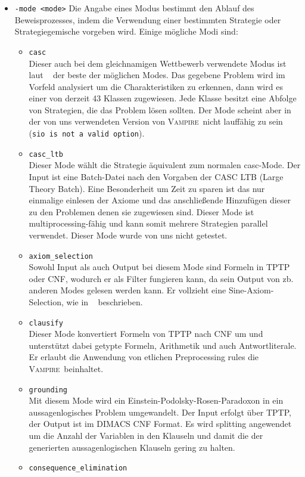 \documentclass{article}
\newcommand{\vampire}{\textsc{Vampire}~}
\begin{document}
\begin{itemize}
\item \verb|-mode <mode>| \label{arg:modes}
Die Angabe eines Modus bestimmt den Ablauf des Beweisprozesses, 
indem die Verwendung einer bestimmten Strategie oder Strategiegemische vorgeben wird.
Einige mögliche Modi sind:
\begin{itemize}
	\item \verb|casc| \\
	Dieser auch bei dem gleichnamigen Wettbewerb verwendete Modus ist laut ~\cite{hoder2011slides} der beste der möglichen Modes.
	Das gegebene Problem wird im Vorfeld analysiert um die Charakteristiken zu erkennen, dann wird es einer von derzeit 43 Klassen zugewiesen. Jede Klasse besitzt eine Abfolge von Strategien, die das Problem lösen sollten.
	Der Mode scheint aber in der von uns verwendeten Version von \vampire nicht lauffähig zu sein (\texttt{sio is not a valid option}).
	\item \verb|casc_ltb| \\
	Dieser Mode wählt die Strategie äquivalent zum normalen casc-Mode. Der Input ist eine Batch-Datei nach den Vorgaben der CASC LTB (Large Theory Batch). Eine Besonderheit um Zeit zu sparen ist das nur einmalige einlesen der Axiome und das anschließende Hinzufügen dieser zu den Problemen denen sie zugewiesen sind. Dieser Mode ist multiprocessing-fähig und kann somit mehrere Strategien parallel verwendet. Dieser Mode wurde von uns nicht getestet.
	\item \verb|axiom_selection| \\
	Sowohl Input als auch Output bei diesem Mode sind Formeln in TPTP oder CNF, wodurch er als Filter fungieren kann, da sein Output von zb. anderen Modes gelesen werden kann.
	Er vollzieht eine Sine-Axiom-Selection, wie in ~\cite{sinquanon} beschrieben.
	\item \verb|clausify| \\
	Dieser Mode konvertiert Formeln von TPTP nach CNF um und unterstützt dabei getypte Formeln, Arithmetik und auch Antwortliterale. Er erlaubt die Anwendung von etlichen Preprocessing rules die \vampire beinhaltet.
	\item \verb|grounding| \\
	Mit diesem Mode wird ein Einstein-Podolsky-Rosen-Paradoxon in ein aussagenlogisches Problem umgewandelt. Der Input erfolgt über TPTP, der Output ist im DIMACS CNF Format.
	Es wird splitting angewendet um die Anzahl der Variablen in den Klauseln und damit die der generierten aussagenlogischen Klauseln gering zu halten.
	\item \verb|consequence_elimination| \\

\end{itemize}
\end{itemize}
\end{document}

